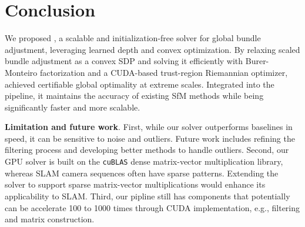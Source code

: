 

\section{Conclusion}
\label{sec:conclusion}
We proposed \nameshort, a scalable and initialization-free solver for global bundle adjustment, leveraging learned depth and convex optimization. By relaxing scaled bundle adjustment as a convex SDP and solving it efficiently with Burer-Monteiro factorization and a CUDA-based trust-region Riemannian optimizer, \nameshort achieved certifiable global optimality at extreme scales. Integrated into the \xmsfm pipeline, it maintains the accuracy of existing SfM methods while being significantly faster and more scalable.  

\textbf{Limitation and future work}. First, while our \nameshort solver outperforms baselines in speed, it can be sensitive to noise and outliers. Future work includes refining the filtering process and developing better methods to handle outliers. Second, our GPU solver is built on the \texttt{cuBLAS} dense matrix-vector multiplication library, whereas SLAM camera sequences often have sparse patterns. Extending the \nameshort solver to support sparse matrix-vector multiplications would enhance its applicability to SLAM. Third, our \xmsfm pipline still has components that potentially can be accelerate 100 to 1000 times through CUDA implementation, e.g., filtering and matrix construction.  

